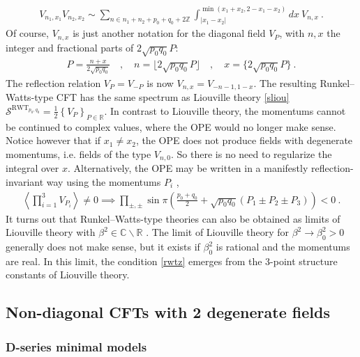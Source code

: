 \documentclass[12pt, a4paper]{article}
\theoremstyle{break}
\begin{document}
\begin{align}
 \boxed{V_{n_1,x_1}V_{n_2,x_2} \sim \sum_{n\in n_1+n_2+p_0+q_0+2\mathbb{Z}}
\int_{|x_1-x_2|}^{\min (x_1+x_2,2-x_1-x_2)} dx\ V_{n, x}}\ .
\end{align}
Of course, $V_{n,x}$ is just another notation for the diagonal field $V_P$, with $n,x$ the integer and fractional parts of $2\sqrt{p_0q_0}P$:
\begin{align}
 P=\frac{n+x}{2\sqrt{p_0q_0}} \quad , \quad n=\Big\lfloor 2\sqrt{p_0q_0}P \Big\rfloor \quad , \quad x = \Big\{2\sqrt{p_0q_0}P \Big\}\ .
\end{align}
The reflection relation $V_P=V_{-P}$ is now $V_{n,x}=V_{-n-1,1-x}$. 
The resulting Runkel--Watts-type CFT has the same spectrum as Liouville theory \eqref{sliou} $
 \mathcal{S}^{\text{RWT}_{p_0,q_0}} = \frac12 \left\{ V_P\right\}_{P\in \mathbb{R}}$. In contrast to Liouville theory, the momentums cannot be continued to complex values, where the OPE would no longer make sense. Notice however that if $x_1\neq x_2$, the OPE does not produce fields with degenerate momentums, i.e. fields of the type $V_{n,0}$. So there is no need to regularize the integral over $x$. Alternatively, the OPE may be written in a manifestly reflection-invariant way using the momentums $P_i$ \cite{rs15},
 \begin{align}
  \left<\prod_{i=1}^3 V_{P_i}\right>\neq 0 \implies \prod_{\pm,\pm} \sin\pi\left(\tfrac{p_0+q_0}{2}+\sqrt{p_0q_0}(P_1\pm P_2\pm P_3)\right) < 0 \ .
  \label{rwtz}
 \end{align}
It turns out that Runkel--Watts-type theories can also be obtained as limits of Liouville theory with $\beta^2\in \mathbb{C}\backslash \mathbb{R}$ \cite{sch03, mce07}. The limit of Liouville theory for $\beta^2\to \beta_0^2>0$ generally does not make sense, but it exists if $\beta_0^2$ is rational and the momentums are real. In this limit, the condition \eqref{rwtz} emerges from the 3-point structure constants of Liouville theory. 


\subsection{Non-diagonal CFTs with 2 degenerate fields}

\subsubsection{D-series minimal models}
\end{document}
